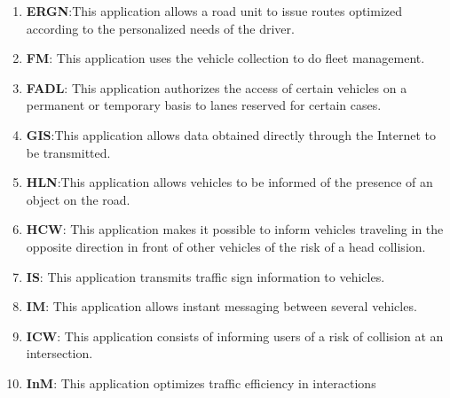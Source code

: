 \begin{enumerate}
\item \textbf{\acrfull{ERGN}}:This application allows a road unit to issue routes optimized according to the personalized needs of the driver. \cite{etsi_etsi_tr_102_638_intelligent_2009}
\item \textbf{\acrfull{FM}}: This application uses the vehicle collection to do fleet management. \cite{etsi_etsi_tr_102_638_intelligent_2009}
\item \textbf{\acrfull{FADL}}: This application authorizes the access of certain vehicles on a permanent or temporary basis to lanes reserved for certain cases. \cite{etsi_etsi_tr_102_638_intelligent_2009,brown_review_2019, hobert_enhancements_2015}
\item \textbf{\acrfull{GIS}}:This application allows data obtained directly through the Internet to be transmitted. \cite{karagiannis_vehicular_2011}
\item \textbf{\acrfull{HLN}}:This application allows vehicles to be informed of the presence of an object on the road. \cite{etsi_etsi_tr_102_638_intelligent_2009,papadimitratos_vehicular_2009,j_vehicle--vehicle_2014}
\item \textbf{\acrfull{HCW}}: This application makes it possible to inform vehicles traveling in the opposite direction in front of other vehicles of the risk of a head collision. \cite{karagiannis_vehicular_2011,chang_intelligent_2010,xiang_research_2014,noauthor_intelligent_nodate,ye_v2v_2008}
\item \textbf{\acrfull{IS}}: This application transmits traffic sign information to vehicles. \cite{etsi_etsi_tr_102_638_intelligent_2009}
\item \textbf{\acrfull{IM}}: This application allows instant messaging between several vehicles. \cite{etsi_etsi_tr_102_638_intelligent_2009}
\item \textbf{\acrfull{ICW}}: This application consists of informing users of a risk of collision at an intersection.\cite{etsi_etsi_tr_102_638_intelligent_2009,papadimitratos_vehicular_2009,j_vehicle--vehicle_2014,al-sultan_comprehensive_2014,karagiannis_vehicular_2011,araniti_lte_2013,gupta_medium_2015,abid_pedestrian_2013}
\item \textbf{\acrfull{InM}}: This application optimizes traffic efficiency in interactions \cite{etsi_etsi_tr_102_638_intelligent_2009,papadimitratos_vehicular_2009, hobert_enhancements_2015}

\end{enumerate}
